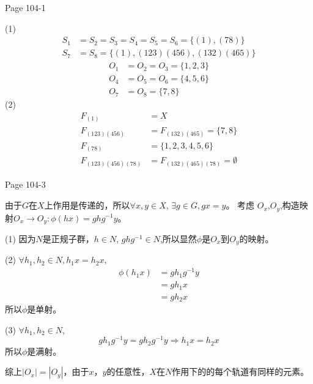 \documentclass{ximera}
\begin{document}
\begin{problem} Page 104-1
    \begin{solution}
        (1)
        $$
        \begin{aligned}
        S_1 &= S_2 =S_3 =S_4 =S_5 = S_6 = \{(1), (78)\} \\ 
        S_7 &= S_8 = \{(1), (123)(456),(132)(465)\} 
        \end{aligned}
        $$
        $$
        \begin{aligned}
            O_1 &= O_2 = O_3 = \{ 1, 2, 3 \} \\
            O_4 &= O_5 = O_6 = \{ 4, 5, 6 \} \\
            O_7 &= O_8 = \{ 7, 8 \}
        \end{aligned}
        $$
        (2)
        $$
        \begin{aligned}
            F_{(1)} &= X \\
            F_{(123)(456)} &= F_{(132)(465)} = \{ 7, 8 \} \\
            F_{(78)} &= \{ 1, 2, 3, 4, 5, 6 \} \\
            F_{(123)(456)(78)} &= F_{(132)(465)(78)} = \emptyset
        \end{aligned}
        $$
    \end{solution}
\end{problem}

\begin{problem} Page 104-3
    \begin{solution}
        由于$G$在$X$上作用是传递的，所以$\forall x, y \in X$, $\exists g \in G, gx = y$。
        考虑 $O_x$,$O_y$,构造映射$O_x \rightarrow O_y : \phi(hx) = ghg^{-1}y$。

        (1) 因为$N$是正规子群，$h \in N$, $ghg^{-1} \in N$,所以显然$\phi$是$O_x$到$O_y$的映射。

        (2) $\forall h_1, h_2 \in N, h_1x = h_2x$,
        $$
        \begin{aligned}
            \phi(h_1x) &= gh_1g^{-1}y \\
            &= gh_1x \\
            &= gh_2x
        \end{aligned}
        $$
        所以$\phi$是单射。

        (3) $\forall h_1, h_2 \in N$,
        $$
        gh_1g^{-1}y = gh_2g^{-1}y \Rightarrow h_1x = h_2x
        $$
        所以$\phi$是满射。

        综上$|O_x|=|O_y|$，由于$x$，$y$的任意性，$X$在$N$作用下的的每个轨道有同样的元素。
    \end{solution}
\end{problem}
\end{document}

